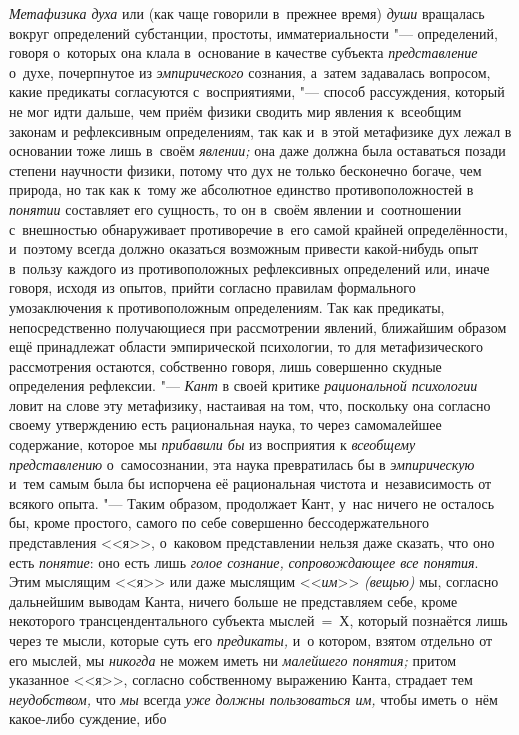{\em Метафизика духа} или (как чаще говорили в~прежнее время)
{\em души} вращалась
вокруг определений субстанции, простоты, имматериальности
"--- определений, говоря о~которых она клала в~основание в
качестве субъекта {\em представление}
о~духе, почерпнутое из {\em эмпирического}
сознания, а~затем задавалась вопросом, какие предикаты
согласуются с~восприятиями, "--- способ рассуждения, который не
мог идти дальше, чем приём физики сводить мир явления к~всеобщим законам и
рефлексивным определениям, так как и~в этой метафизике дух лежал в
основании тоже лишь в~своём {\em явлении;} она даже
должна была оставаться позади степени научности физики,
потому что дух не только бесконечно богаче, чем природа, но
так как к~тому же абсолютное единство противоположностей в
{\em понятии} составляет
его сущность, то он в~своём явлении и~соотношении с~внешностью обнаруживает
противоречие в~его самой крайней определённости, и~поэтому всегда должно
оказаться возможным привести какой-нибудь опыт в~пользу каждого из
противоположных рефлексивных определений или, иначе говоря, исходя из
опытов, прийти согласно правилам формального умозаключения к
противоположным определениям. Так как предикаты, непосредственно
получающиеся при рассмотрении явлений, ближайшим образом ещё принадлежат
области эмпирической психологии, то для метафизического рассмотрения
остаются, собственно говоря, лишь совершенно скудные определения
рефлексии. "--- {\em Кант} в
своей критике {\em рациональной
психологии} ловит на слове эту метафизику, настаивая на том,
что, поскольку она согласно своему утверждению есть рациональная наука, то
через самомалейшее содержание, которое мы
{\em прибавили бы} из
восприятия к {\em всеобщему
представлению} о~самосознании, эта наука превратилась бы в
{\em эмпирическую} и~тем
самым была бы испорчена её рациональная чистота и~независимость от всякого
опыта. "--- Таким образом, продолжает Кант, у~нас ничего не
осталось бы, кроме простого, самого по себе совершенно бессодержательного
представления <<я>>, о~каковом представлении нельзя даже сказать, что оно
есть {\em понятие}: оно есть лишь {\em голое сознание,}
{\em сопровождающее все понятия}. Этим мыслящим <<я>> или даже мыслящим
<<{\em им}>> {\em (вещью)} мы, согласно
дальнейшим выводам Канта, ничего больше не представляем себе, кроме
некоторого трансцендентального субъекта мыслей~=~Х, который познаётся лишь
через те мысли, которые суть его {\em предикаты,} и~о
котором, взятом отдельно от его мыслей, мы {\em никогда} не можем
иметь ни {\em малейшего понятия;}
притом указанное <<я>>, согласно собственному выражению Канта,
страдает тем {\em неудобством,} что {\em мы} всегда {\em уже должны
пользоваться им,} чтобы иметь о~нём какое-либо суждение, ибо
